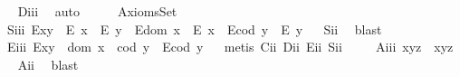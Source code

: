 \begin{isabellebody}
\isadelimproof
\ %
\endisadelimproof
%
\isatagproof
{}\isamarkupfalse%
\ D\isactrlsub i\isactrlsub i\isactrlsub i\ \isamarkupfalse%
\ auto%
\endisatagproof
{\isafoldproof}%
%
\isadelimproof
%
\endisadelimproof
\isanewline
\ \ \isamarkupfalse%
%
\isamarkuptrue%
\ \isamarkupfalse%
\ AxiomsSet{}\isanewline
\ \ \isanewline
\ \ \ \isamarkupfalse%
\ S\isactrlsub i\isactrlsub i\isactrlsub i{\isacharcolon}\ {\isachardoublequoteopen}{\isacharparenleft}E{\isacharparenleft}x{\isasymcdot}y{\isacharparenright}\ \isactrlbold {\isasymrightarrow}\ {\isacharparenleft}E\ x\ \isactrlbold {\isasymand}\ E\ y{\isacharparenright}{\isacharparenright}\ \isactrlbold {\isasymand}\ {\isacharparenleft}E{\isacharparenleft}dom\ x{\isacharparenright}\ \isactrlbold {\isasymrightarrow}\ E\ x{\isacharparenright}\ \isactrlbold {\isasymand}\ {\isacharparenleft}E{\isacharparenleft}cod\ y{\isacharparenright}\ \isactrlbold {\isasymrightarrow}\ E\ y{\isacharparenright}{\isachardoublequoteclose}%
\isadelimproof
\ %
\endisadelimproof
%
\isatagproof
{}\isamarkupfalse%
\ S\isactrlsub i\isactrlsub i\ \isamarkupfalse%
\ blast%
\endisatagproof
{\isafoldproof}%
%
\isadelimproof
%
\endisadelimproof
\ \isanewline
\ \ \ \isamarkupfalse%
\ E\isactrlsub i\isactrlsub i\isactrlsub i{\isacharcolon}\ {\isachardoublequoteopen}E{\isacharparenleft}x{\isasymcdot}y{\isacharparenright}\ \isactrlbold {\isasymleftarrow}\ {\isacharparenleft}dom\ x\ {\isasymcong}\ cod\ y\ \isactrlbold {\isasymand}\ E{\isacharparenleft}cod\ y{\isacharparenright}{\isacharparenright}{\isachardoublequoteclose}%
\isadelimproof
\ %
\endisadelimproof
%
\isatagproof
{}\isamarkupfalse%
\ {\isacharparenleft}metis\ C\isactrlsub i\isactrlsub i\ D\isactrlsub i\isactrlsub i\ E\isactrlsub i\isactrlsub i\ S\isactrlsub i\isactrlsub i{\isacharparenright}%
\endisatagproof
{\isafoldproof}%
%
\isadelimproof
%
\endisadelimproof
\isanewline
\ \ \ \isamarkupfalse%
\ A\isactrlsub i\isactrlsub i\isactrlsub i{\isacharcolon}\ {\isachardoublequoteopen}x{\isasymcdot}{\isacharparenleft}y{\isasymcdot}z{\isacharparenright}\ {\isasymcong}\ {\isacharparenleft}x{\isasymcdot}y{\isacharparenright}{\isasymcdot}z{\isachardoublequoteclose}%
\isadelimproof
\ %
\endisadelimproof
%
\isatagproof
{}\isamarkupfalse%
\ A\isactrlsub i\isactrlsub i\ \isamarkupfalse%
\ blast%
\endisatagproof
{\isafoldproof}%
%

\end{isabellebody}
